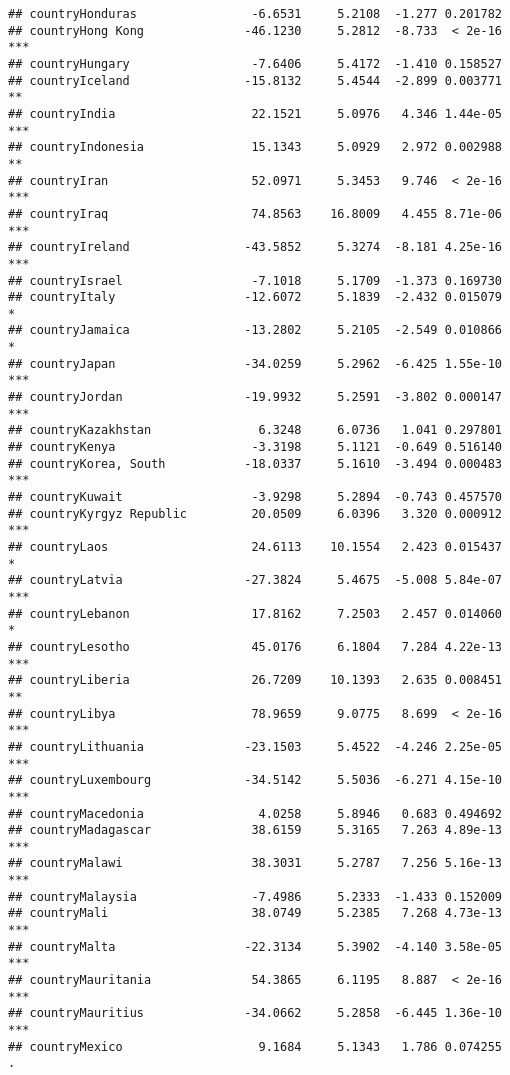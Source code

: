 \documentclass[
  11pt,
]{article}
\begin{document}
\begin{verbatim}
## countryHonduras                -6.6531     5.2108  -1.277 0.201782    
## countryHong Kong              -46.1230     5.2812  -8.733  < 2e-16 ***
## countryHungary                 -7.6406     5.4172  -1.410 0.158527    
## countryIceland                -15.8132     5.4544  -2.899 0.003771 ** 
## countryIndia                   22.1521     5.0976   4.346 1.44e-05 ***
## countryIndonesia               15.1343     5.0929   2.972 0.002988 ** 
## countryIran                    52.0971     5.3453   9.746  < 2e-16 ***
## countryIraq                    74.8563    16.8009   4.455 8.71e-06 ***
## countryIreland                -43.5852     5.3274  -8.181 4.25e-16 ***
## countryIsrael                  -7.1018     5.1709  -1.373 0.169730    
## countryItaly                  -12.6072     5.1839  -2.432 0.015079 *  
## countryJamaica                -13.2802     5.2105  -2.549 0.010866 *  
## countryJapan                  -34.0259     5.2962  -6.425 1.55e-10 ***
## countryJordan                 -19.9932     5.2591  -3.802 0.000147 ***
## countryKazakhstan               6.3248     6.0736   1.041 0.297801    
## countryKenya                   -3.3198     5.1121  -0.649 0.516140    
## countryKorea, South           -18.0337     5.1610  -3.494 0.000483 ***
## countryKuwait                  -3.9298     5.2894  -0.743 0.457570    
## countryKyrgyz Republic         20.0509     6.0396   3.320 0.000912 ***
## countryLaos                    24.6113    10.1554   2.423 0.015437 *  
## countryLatvia                 -27.3824     5.4675  -5.008 5.84e-07 ***
## countryLebanon                 17.8162     7.2503   2.457 0.014060 *  
## countryLesotho                 45.0176     6.1804   7.284 4.22e-13 ***
## countryLiberia                 26.7209    10.1393   2.635 0.008451 ** 
## countryLibya                   78.9659     9.0775   8.699  < 2e-16 ***
## countryLithuania              -23.1503     5.4522  -4.246 2.25e-05 ***
## countryLuxembourg             -34.5142     5.5036  -6.271 4.15e-10 ***
## countryMacedonia                4.0258     5.8946   0.683 0.494692    
## countryMadagascar              38.6159     5.3165   7.263 4.89e-13 ***
## countryMalawi                  38.3031     5.2787   7.256 5.16e-13 ***
## countryMalaysia                -7.4986     5.2333  -1.433 0.152009    
## countryMali                    38.0749     5.2385   7.268 4.73e-13 ***
## countryMalta                  -22.3134     5.3902  -4.140 3.58e-05 ***
## countryMauritania              54.3865     6.1195   8.887  < 2e-16 ***
## countryMauritius              -34.0662     5.2858  -6.445 1.36e-10 ***
## countryMexico                   9.1684     5.1343   1.786 0.074255 .  

\end{verbatim}
\end{document}
